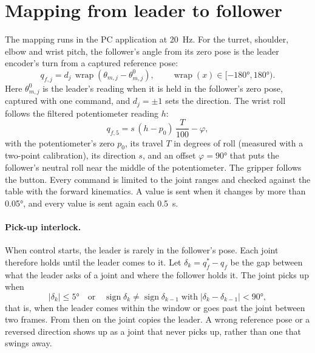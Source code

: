 \documentclass[11pt,a4paper]{article}
\begin{document}
\section{Mapping from leader to follower}

The mapping runs in the PC application at \SI{20}{\hertz}. For the turret, shoulder, elbow and wrist pitch,
the follower's angle from its zero pose is the leader encoder's turn from a captured reference pose:
\begin{equation}
  q_{f,j}=d_j\,\operatorname{wrap}\!\left(\theta_{m,j}-\theta_{m,j}^{0}\right),\qquad
  \operatorname{wrap}(x)\in[-\ang{180},\ang{180}).
\end{equation}
Here $\theta_{m,j}^{0}$ is the leader's reading when it is held in the follower's zero pose, captured with one
command, and $d_j=\pm1$ sets the direction. The wrist roll follows the filtered potentiometer reading $h$:
\begin{equation}
  q_{f,5}=s\,(h-p_0)\,\frac{T}{100}-\varphi,
\end{equation}
with the potentiometer's zero $p_0$, its travel $T$ in degrees of roll (measured with a two-point calibration),
its direction $s$, and an offset $\varphi=\ang{90}$ that puts the follower's neutral roll near the middle of the
potentiometer. The gripper follows the button. Every command is limited to the joint ranges and checked against
the table with the forward kinematics. A value is sent when it changes by more than \ang{0.05}, and every value
is sent again each \SI{0.5}{\second}.

\paragraph{Pick-up interlock.} When control starts, the leader is rarely in the follower's pose. Each joint
therefore holds until the leader comes to it. Let $\delta_k=q_{f}^{*}-q_{f}$ be the gap between what the leader
asks of a joint and where the follower holds it. The joint picks up when
\begin{equation}
  |\delta_k|\le\ang{5}\quad\text{or}\quad\operatorname{sign}\delta_k\ne\operatorname{sign}\delta_{k-1}
  \;\text{with}\;|\delta_k-\delta_{k-1}|<\ang{90},
\end{equation}
that is, when the leader comes within the window or goes past the joint between two frames. From then on the
joint copies the leader. A wrong reference pose or a reversed direction shows up as a joint that never picks up,
rather than one that swings away.
\end{document}
